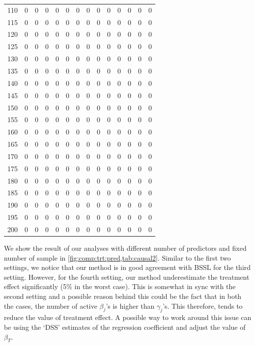 \documentclass[preprint,12pt]{elsarticle}
\begin{document}
\begin{table}
\begin{tabular}{|c||rrr|r||rr|r||rr|r||rr|r|}
  110 &   0 &   0 &   0 &  0 &   0 &   0 &   0 &   0 &   0 &   0 &   0&   0&   0\\ 
  115 &   0 &   0 &   0 &  0 &   0 &   0 &   0 &   0 &   0 &   0 &   0&   0&   0\\ 
  120 &   0 &   0 &   0 &  0 &   0 &   0 &   0 &   0 &   0 &   0 &   0&   0&   0\\ 
  125 &   0 &   0 &   0 &  0 &   0 &   0 &   0 &   0 &   0 &   0 &   0&   0&   0\\ 
  130 &   0 &   0 &   0 &  0 &   0 &   0 &   0 &   0 &   0 &   0 &   0&   0&   0\\ 
  135 &   0 &   0 &   0 &  0 &   0 &   0 &   0 &   0 &   0 &   0 &   0&   0&   0\\ 
  140 &   0 &   0 &   0 &  0 &   0 &   0 &   0 &   0 &   0 &   0 &   0&   0&   0\\ 
  145 &   0 &   0 &   0 &  0 &   0 &   0 &   0 &   0 &   0 &   0 &   0&   0&   0\\ 
  150 &   0 &   0 &   0 &  0 &   0 &   0 &   0 &   0 &   0 &   0 &   0&   0&   0\\ 
  155 &   0 &   0 &   0 &  0 &   0 &   0 &   0 &   0 &   0 &   0 &   0&   0&   0\\ 
  160 &   0 &   0 &   0 &  0 &   0 &   0 &   0 &   0 &   0 &   0 &   0&   0&   0\\ 
  165 &   0 &   0 &   0 &  0 &   0 &   0 &   0 &   0 &   0 &   0 &   0&   0&   0\\ 
  170 &   0 &   0 &   0 &  0 &   0 &   0 &   0 &   0 &   0 &   0 &   0&   0&   0\\ 
  175 &   0 &   0 &   0 &  0 &   0 &   0 &   0 &   0 &   0 &   0 &   0&   0&   0\\ 
  180 &   0 &   0 &   0 &  0 &   0 &   0 &   0 &   0 &   0 &   0 &   0&   0&   0\\ 
  185 &   0 &   0 &   0 &  0 &   0 &   0 &   0 &   0 &   0 &   0 &   0&   0&   0\\ 
  190 &   0 &   0 &   0 &  0 &   0 &   0 &   0 &   0 &   0 &   0 &   0&   0&   0\\ 
  195 &   0 &   0 &   0 &  0 &   0 &   0 &   0 &   0 &   0 &   0 &   0&   0&   0\\ 
  200 &   0 &   0 &   0 &  0 &   0 &   0 &   0 &   0 &   0 &   0 &   0&   0&   0\\ 
   \hline
\end{tabular}
\end{table}

We show the result of our analyses with different number of predictors and
fixed number of sample in \cref{fig:comp:trt:pred,tab:causal2}. Similar to
the first two settings, we notice that our method is in good agreement with
BSSL for the third setting. However, for the fourth setting, our method
underestimate the treatment effect significantly (5\% in the worst case). This
is somewhat in sync with the second setting and a possible reason behind this
could be the fact that in both the cases, the number of active $\beta_j$'s is
higher than $\gamma_j$'s. This therefore, tends to reduce the value of treatment
effect. A possible way to work around this issue can be using the `DSS' estimates
of the regression coefficient and adjust the value of $\beta_T$. 
\end{document}
